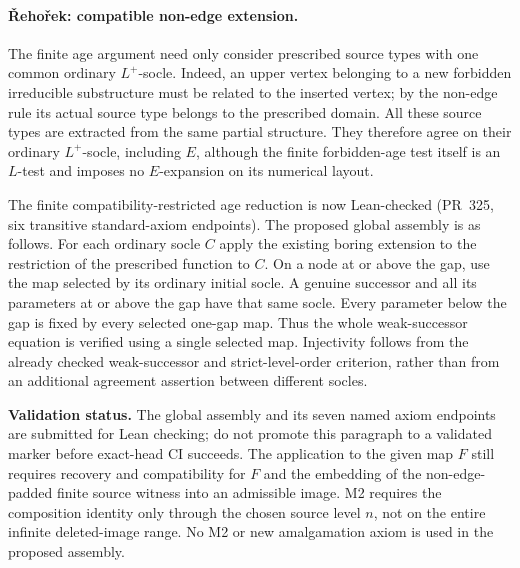 \paragraph{\v{R}eho\v{r}ek: compatible non-edge extension.}
The finite age argument need only consider prescribed source types with
one common ordinary $L^+$-socle.  Indeed, an upper vertex belonging to a
new forbidden irreducible substructure must be related to the inserted
vertex; by the non-edge rule its actual source type belongs to the
prescribed domain.  All these source types are extracted from the same
partial structure.  They therefore agree on their ordinary $L^+$-socle,
including $E$, although the finite forbidden-age test itself is an
$L$-test and imposes no $E$-expansion on its numerical layout.

The finite compatibility-restricted age reduction is now Lean-checked
(PR~325, six transitive standard-axiom endpoints).  The proposed global
assembly is as follows.  For each ordinary socle $C$ apply the existing
boring extension to the restriction of the prescribed function to $C$.
On a node at or above the gap, use the map selected by its ordinary
initial socle.  A genuine successor and all its parameters at or above
the gap have that same socle.  Every parameter below the gap is fixed
by every selected one-gap map.  Thus the whole weak-successor equation
is verified using a single selected map.  Injectivity follows from the
already checked weak-successor and strict-level-order criterion, rather
than from an additional agreement assertion between different socles.

\textbf{Validation status.} The global assembly and its seven named
axiom endpoints are submitted for Lean checking; do not promote this
paragraph to a validated marker before exact-head CI succeeds.
The application to the given map $F$ still requires recovery and
compatibility for $F$ and the embedding of the non-edge-padded finite
source witness into an admissible image.  M2 requires the composition
identity only through the chosen source level $n$, not on the entire
infinite deleted-image range.  No M2 or new amalgamation axiom is used
in the proposed assembly.
